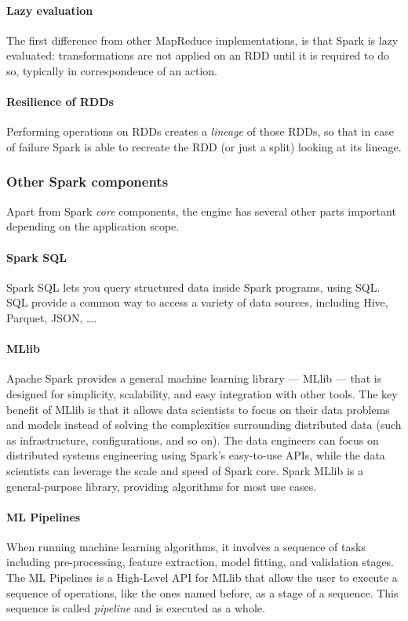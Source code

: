 \documentclass[\main/main.tex]{subfiles}
\begin{document}
\paragraph{Lazy evaluation}
The first difference from other MapReduce implementations, is that Spark is lazy evaluated: transformations are not applied on an RDD until it is required to do so, typically in correspondence of an action.
\paragraph{Resilience of RDDs}
Performing operations on RDDs creates a \emph{lineage} of those RDDs, so that in case of failure Spark is able to recreate the RDD (or just a split) looking at its lineage.
\newpage
\subsubsection{Other Spark components}
Apart from Spark \emph{core} components, the engine has several other parts important depending on the application scope.
\paragraph{Spark SQL} Spark SQL lets you query structured data inside Spark programs, using SQL. SQL provide a common way to access a variety of data sources, including Hive, Parquet, JSON, \dots.
\paragraph{MLlib} Apache Spark provides a general machine learning library — MLlib — that is designed for simplicity, scalability, and easy integration with other tools. The key benefit of MLlib is that it allows data scientists to focus on their data problems and models instead of solving the complexities surrounding distributed data (such as infrastructure, configurations, and so on). The data engineers can focus on distributed systems engineering using Spark’s easy-to-use APIs, while the data scientists can leverage the scale and speed of Spark core. Spark MLlib is a general-purpose library, providing algorithms for most use cases.
\paragraph{ML Pipelines} When running machine learning algorithms, it involves a sequence of tasks including pre-processing, feature extraction, model fitting, and validation stages. The ML Pipelines is a High-Level API for MLlib that allow the user to execute a sequence of operations, like the ones named before, as a stage of a sequence. This sequence is called \emph{pipeline} and is executed as a whole.
\end{document}
